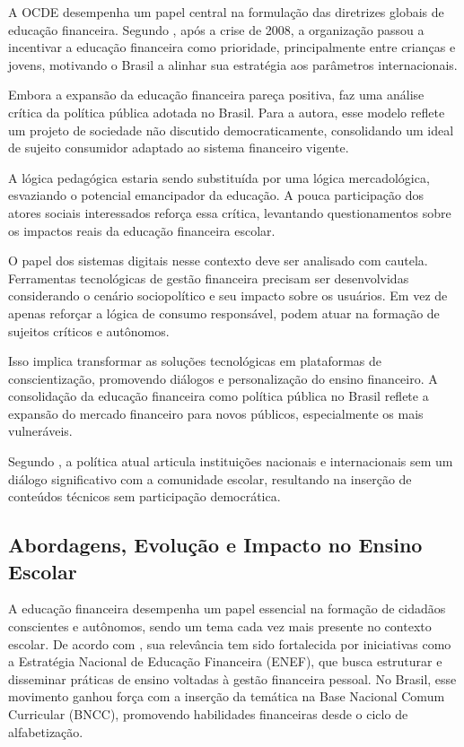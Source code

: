 \documentclass[
	article,			%
	12pt,				%
	oneside,			%
	a4paper,			%
	english,			%
	brazil,				%
	sumario=tradicional
	]{abntex2}
\begin{document}
    A OCDE desempenha um papel central na formulação das diretrizes globais de educação financeira. Segundo , após a crise de 2008, a organização passou a incentivar a educação financeira como prioridade, principalmente entre crianças e jovens, motivando o Brasil a alinhar sua estratégia aos parâmetros internacionais.

    Embora a expansão da educação financeira pareça positiva,  faz uma análise crítica da política pública adotada no Brasil. Para a autora, esse modelo reflete um projeto de sociedade não discutido democraticamente, consolidando um ideal de sujeito consumidor adaptado ao sistema financeiro vigente.

    A lógica pedagógica estaria sendo substituída por uma lógica mercadológica, esvaziando o potencial emancipador da educação. A pouca participação dos atores sociais interessados reforça essa crítica, levantando questionamentos sobre os impactos reais da educação financeira escolar.

    O papel dos sistemas digitais nesse contexto deve ser analisado com cautela. Ferramentas tecnológicas de gestão financeira precisam ser desenvolvidas considerando o cenário sociopolítico e seu impacto sobre os usuários. Em vez de apenas reforçar a lógica de consumo responsável, podem atuar na formação de sujeitos críticos e autônomos.

    Isso implica transformar as soluções tecnológicas em plataformas de conscientização, promovendo diálogos e personalização do ensino financeiro. A consolidação da educação financeira como política pública no Brasil reflete a expansão do mercado financeiro para novos públicos, especialmente os mais vulneráveis.

    Segundo , a política atual articula instituições nacionais e internacionais sem um diálogo significativo com a comunidade escolar, resultando na inserção de conteúdos técnicos sem participação democrática.

\subsection{Abordagens, Evolução e Impacto no Ensino Escolar}
    A educação financeira desempenha um papel essencial na formação de cidadãos conscientes e autônomos, sendo um tema cada vez mais presente no contexto escolar. De acordo com , sua relevância tem sido fortalecida por iniciativas como a Estratégia Nacional de Educação Financeira (ENEF), que busca estruturar e disseminar práticas de ensino voltadas à gestão financeira pessoal. No Brasil, esse movimento ganhou força com a inserção da temática na Base Nacional Comum Curricular (BNCC), promovendo habilidades financeiras desde o ciclo de alfabetização.
\end{document}
